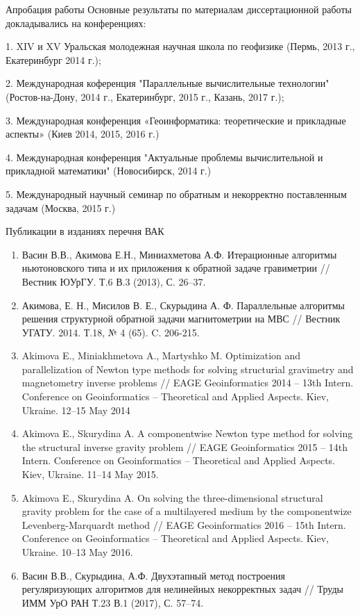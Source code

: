 \documentclass[10pt,pdf, mathserif, hyperref={unicode}]{beamer}
\begin{document}
\begin{frame}{Апробация работы}
	Основные результаты по материалам диссертационной работы докладывались на конференциях:
	
	
	1. XIV и XV Уральская молодежная научная школа по геофизике (Пермь, 2013 г., Екатеринбург 2014 г.);
	
	2. Международная коференция "Параллельные вычислительные технологии" (Ростов-на-Дону, 2014 г., Екатеринбург, 2015 г., Казань, 2017 г.);
	
	3. Международная конференция «Геоинформатика: теоретические и прикладные аспекты» (Киев 2014, 2015, 2016 г.)
	
	4. Международная конференция "Актуальные проблемы вычислительной и прикладной математики" (Новосибирск, 2014 г.)
	
	5. Международный научный семинар по обратным и некорректно поставленным задачам (Москва, 2015 г.)
\end{frame}

\begin{frame}{Публикации в изданиях перечня ВАК}
	\begin{enumerate}
		\item Васин В.В., Акимова Е.Н., Миниахметова А.Ф. Итерационные алгоритмы ньютоновского типа и их приложения к обратной задаче гравиметрии // Вестник ЮУрГУ. Т.6 В.3 (2013), С. 26–37.
		\item Акимова, Е. Н., Мисилов В. Е., Скурыдина А. Ф. Параллельные алгоритмы решения структурной обратной задачи магнитометрии на МВС // Вестник УГАТУ. 2014. Т.18, № 4 (65). C. 206-215.
		\item Akimova E., Miniakhmetova A., Martyshko M. Optimization and parallelization of Newton type methods for solving structurial gravimetry and magnetometry inverse problems // EAGE Geoinformatics 2014 – 13th Intern. Conference on Geoinformatics – Theoretical and Applied Aspects. Kiev, Ukraine. 12–15 May 2014
		\item Akimova E., Skurydina A. A componentwise Newton type method for solving the structural inverse gravity problem // EAGE Geoinformatics 2015 – 14th Intern. Conference on Geoinformatics – Theoretical and Applied Aspects. Kiev, Ukraine. 11–14 May 2015.
		\item Akimova E., Skurydina A. On solving the three-dimensional structural gravity problem for the case of a multilayered medium by the componentwize Levenberg-Marquardt method // EAGE Geoinformatics 2016 – 15th Intern. Conference on Geoinformatics – Theoretical and Applied Aspects. Kiev, Ukraine. 10–13 May 2016.
		\item Васин В.В., Скурыдина, А.Ф. Двухэтапный метод построения регуляризующих алгоритмов для нелинейных некорректных задач // Труды ИММ УрО РАН Т.23 В.1 (2017), С. 57–74.
		
	\end{enumerate}
\end{frame}
	
\end{document}
